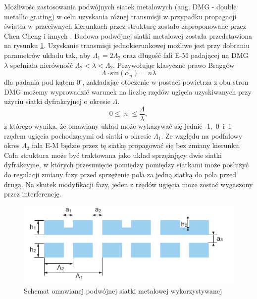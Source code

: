 Możliwośc zastosowania podwójnych siatek metalowych (ang. DMG - double metallic grating) w celu uzyskania różnej transmisji w przypadku propagacji światła w przeciwnych kierunkach przez strukturę zostało zaproponowane przez Chen Cheng i innych \cite{cheng2007controllable,cheng2008physical,xu2011unidirectional}. Budowa podwójnej siatki metalowej została przedstawiona na rysunku \ref{fig:1ddmg-schem}. Uzyskanie transmisji jednokierunkowej możliwe jest przy dobraniu parametrów układu tak, aby $\Lambda_1 = 2\Lambda_2$ oraz długość fali E-M padającej na DMG  $\lambda$ spełniała nierówność $\Lambda_2<\lambda<\Lambda_2$. Przywołując klasyczne prawo Braggów
\begin{equation}
	\Lambda \cdot \textrm{sin}(\alpha_n) = n \lambda 
\end{equation}
dla padania pod kątem $0^{\circ}$, zakładając otoczenie w postaci powietrza z obu stron DMG możemy wyprowadzić warunek na liczbę rzędów ugięcia uzyskiwanych przy użyciu siatki dyfrakcyjnej o okresie $\Lambda$. 
\begin{equation}
	 0 \le |n| \le \frac { \Lambda }{\lambda},
\end{equation}
z którego wynika, że omawiany układ może wykazywać się jednie -1,~0~i~1 rzędem ugięcia pochodzącymi od siatki o okresie $\Lambda_1$. Ze względu na podfalowy okres $\Lambda_2$ fala E-M będzie przez tę siatkę propagować się bez zmiany kierunku. Cała struktura może być traktowana jako układ sprzężający dwie siatki dyfrakcyjne, w których przesunięcie pomiędzy pomiędzy siatkami może posłużyć do regulacji zmiany fazy przed sprzężenie pola za jedną siatką do pola przed drugą\cite{marcet2008controlling}. Na skutek modyfikacji fazy, jeden z rzędów ugięcia może zostać wygaszony przez interferencję. 
	
\begin{figure}[tb]
	\includegraphics[width=\textwidth]{images/thz/1D-DMG-schemat.png}
	\caption{Schemat omawianej podwójnej siatki metalowej wykorzystywanej }
	\label{fig:1ddmg-schem}
\end{figure}



